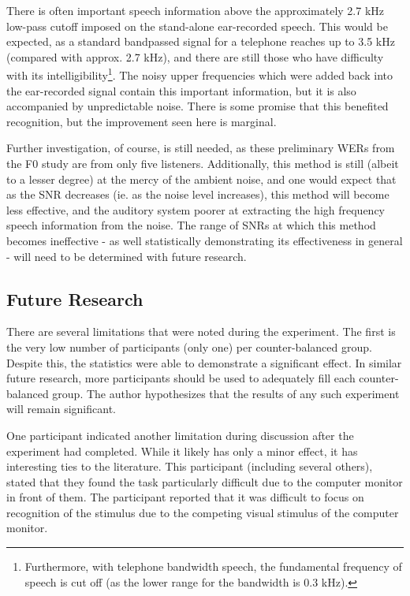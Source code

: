 There is often important speech information above the approximately 2.7 kHz low-pass cutoff imposed on the stand-alone ear-recorded speech.  This would be expected, as a standard bandpassed signal for a telephone reaches up to 3.5 kHz (compared with approx. 2.7 kHz), and there are still those who have difficulty with its intelligibility\footnote{Furthermore, with telephone bandwidth speech, the fundamental frequency of speech is cut off (as the lower range for the bandwidth is 0.3 kHz).}.  The noisy upper frequencies which were added back into the ear-recorded signal contain this important information, but it is also accompanied by unpredictable noise.  There is some promise that this benefited recognition, but the improvement seen here is marginal.

Further investigation, of course, is still needed, as these preliminary WERs from the F0 study are from only five listeners.  Additionally, this method is still (albeit to a lesser degree) at the mercy of the ambient noise, and one would expect that as the SNR decreases (ie. as the noise level increases), this method will become less effective, and the auditory system poorer at extracting the high frequency speech information from the noise.  The range of SNRs at which this method becomes ineffective - as well statistically demonstrating its effectiveness in general - will need to be determined with future research.

\subsection{Future Research}\label{chap3:future-research}

There are several limitations that were noted during the experiment.  The first is the very low number of participants (only one) per counter-balanced group.  Despite this, the statistics were able to demonstrate a significant effect.  In similar future research, more participants should be used to adequately fill each counter-balanced group.  The author hypothesizes that the results of any such experiment will remain significant.  

One participant indicated another limitation during discussion after the experiment had completed.  While it likely has only a minor effect, it has interesting ties to the literature.  This participant (including several others), stated that they found the task particularly difficult due to the computer monitor in front of them.  The participant reported that it was difficult to focus on recognition of the stimulus due to the competing visual stimulus of the computer monitor.

